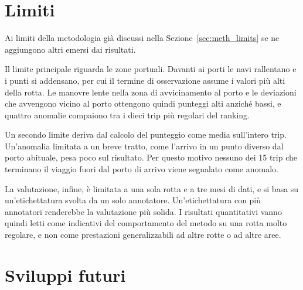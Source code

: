 \section[Limiti]{Limiti}\label{sec:concl_limits}

Ai limiti della metodologia già discussi nella Sezione~\ref{sec:meth_limits} se ne aggiungono altri
emersi dai risultati.

Il limite principale riguarda le zone portuali. Davanti ai porti le navi rallentano e i punti si
addensano, per cui il termine di osservazione assume i valori più alti della rotta. Le manovre lente
nella zona di avvicinamento al porto e le deviazioni che avvengono vicino al porto ottengono
quindi punteggi alti anziché bassi, e quattro anomalie compaiono tra i dieci trip più regolari del
ranking.

Un secondo limite deriva dal calcolo del punteggio come media sull'intero trip. Un'anomalia limitata
a un breve tratto, come l'arrivo in un punto diverso dal porto abituale, pesa poco sul risultato.
Per questo motivo nessuno dei 15 trip che terminano il viaggio fuori dal porto di arrivo viene
segnalato come anomalo.

La valutazione, infine, è limitata a una sola rotta e a tre mesi di dati, e si basa su
un'etichettatura svolta da un solo annotatore. Un'etichettatura con più annotatori renderebbe la valutazione più solida. I risultati quantitativi vanno quindi letti come
indicativi del comportamento del metodo su una rotta molto regolare, e non come prestazioni
generalizzabili ad altre rotte o ad altre aree.

\section[Sviluppi futuri]{Sviluppi futuri}\label{sec:concl_future}

